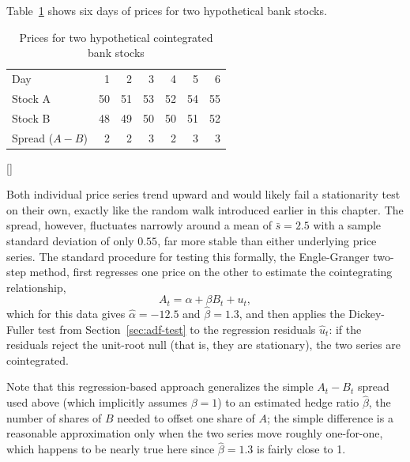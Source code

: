 \documentclass[../ai_in_finance]{subfiles}
\begin{document}
Table~\ref{tab:pairs_trading} shows six days of prices for two hypothetical bank stocks.

\begin{table}[htbp]
\centering
\begin{lrbox}{\bookmeasuredbox}
\begin{tabular}{lrrrrrr}
\toprule
Day & 1 & 2 & 3 & 4 & 5 & 6 \\
Stock A & 50 & 51 & 53 & 52 & 54 & 55 \\
Stock B & 48 & 49 & 50 & 50 & 51 & 52 \\
Spread ($A-B$) & 2 & 2 & 3 & 2 & 3 & 3 \\
\bottomrule
\end{tabular}
\end{lrbox}
\ifdim\wd\bookmeasuredbox<0.65\linewidth
\setlength{\bookcapwidth}{0.65\linewidth}
\else
\setlength{\bookcapwidth}{\wd\bookmeasuredbox}
\fi
{}[\bookcapwidth]{
\usebox{\bookmeasuredbox}
}{
\caption{Prices for two hypothetical cointegrated bank stocks}
\label{tab:pairs_trading}
}
\end{table}

Both individual price series trend upward and would likely fail a stationarity test on their own, exactly like the random walk introduced earlier in this chapter. The spread, however, fluctuates narrowly around a mean of $\bar{s} = 2.5$ with a sample standard deviation of only $0.55$, far more stable than either underlying price series. The standard procedure for testing this formally, the Engle-Granger two-step method, first regresses one price on the other to estimate the cointegrating relationship,
\begin{equation*}
A_t = \alpha + \beta B_t + u_t,
\end{equation*}
which for this data gives $\hat\alpha = -12.5$ and $\hat\beta = 1.3$, and then applies the Dickey-Fuller test from Section~\ref{sec:adf-test} to the regression residuals $\hat u_t$: if the residuals reject the unit-root null (that is, they are stationary), the two series are cointegrated.

Note that this regression-based approach generalizes the simple $A_t - B_t$ spread used above (which implicitly assumes $\beta=1$) to an estimated hedge ratio $\hat\beta$, the number of shares of $B$ needed to offset one share of $A$; the simple difference is a reasonable approximation only when the two series move roughly one-for-one, which happens to be nearly true here since $\hat\beta=1.3$ is fairly close to 1.
\end{document}
